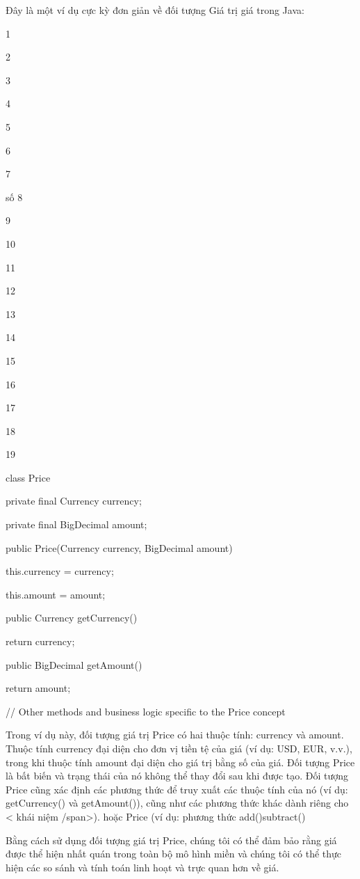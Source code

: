 Đây là một ví dụ cực kỳ đơn giản về đối tượng Giá trị giá trong Java:

1

2

3

4

5

6

7

số 8

9

10

11

12

13

14

15

16

17

18

19

class Price {

private final Currency currency;

private final BigDecimal amount;

public Price(Currency currency, BigDecimal amount) {

this.currency = currency;

this.amount = amount;

}

public Currency getCurrency() {

return currency;

}

public BigDecimal getAmount() {

return amount;

}

// Other methods and business logic specific to the Price concept

}

Trong ví dụ này, đối tượng giá trị Price có hai thuộc tính: currency và amount. Thuộc tính currency đại diện cho đơn vị tiền tệ của giá (ví dụ: USD, EUR, v.v.), trong khi thuộc tính amount đại diện cho giá trị bằng số của giá. Đối tượng Price là bất biến và trạng thái của nó không thể thay đổi sau khi được tạo. Đối tượng Price cũng xác định các phương thức để truy xuất các thuộc tính của nó (ví dụ: getCurrency() và getAmount()), cũng như các phương thức khác dành riêng cho < khái niệm /span>). hoặc Price (ví dụ: phương thức add()subtract()

Bằng cách sử dụng đối tượng giá trị Price, chúng tôi có thể đảm bảo rằng giá được thể hiện nhất quán trong toàn bộ mô hình miền và chúng tôi có thể thực hiện các so sánh và tính toán linh hoạt và trực quan hơn về giá.


